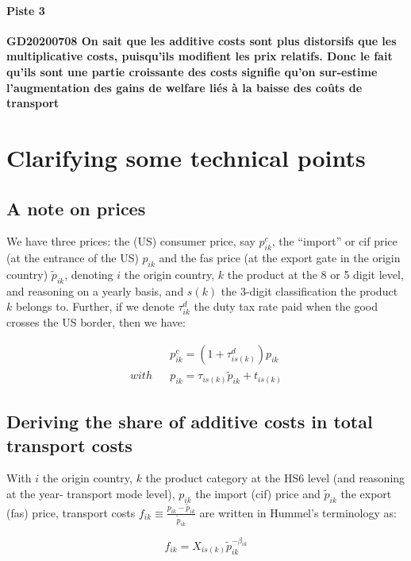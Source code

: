 \documentclass[a4paper,12pt]{article}
\begin{document}
\paragraph{Piste 3} \textbf{GD20200708 On sait que les additive costs sont plus distorsifs que les multiplicative costs, puisqu’ils modifient les prix relatifs. Donc le fait qu’ils sont une partie croissante des costs signifie qu’on sur-estime l’augmentation des gains de welfare liés à la baisse des coûts de transport}

\appendix


\section{Clarifying some technical points \label{ssec:technical_points}}


\subsection{A note on prices}

We have three prices: the (US) consumer price, say $p^{c}_{ik}$, the ``import'' or  cif price (at the entrance of the US) $p_{ik}$ and the fas price (at the export gate in the origin country) $\widetilde{p}_{ik}$, denoting $i$ the origin country, $k$ the product at the 8 or 5 digit level, and reasoning on a yearly basis, and $s(k)$ the 3-digit classification the product $k$ belongs to. Further, if we denote $\tau^d_{ik}$ the duty tax rate paid when the good crosses the US border, then we have:

\begin{eqnarray*}
&&p^c_{ik} = (1+\tau^d_{is(k)})p_{ik} \\
with && p_{ik}  = \tau_{is(k)} \widetilde{p}_{ik} +t_{is(k)}
\end{eqnarray*}


\subsection{Deriving the share of additive costs in total transport costs \label{ssec:interpret_beta}}


With $i$ the origin country, $k$ the product category at the HS6 level (and reasoning at the year- transport mode level), $p_{ik}$ the import (cif) price and $\tilde{p}_{ik}$ the export (fas) price, transport costs $f_{ik}\equiv \frac{p_{ik}- \tilde{p}_{ik}}{\tilde{p}_{ik}} $ are written in Hummel's terminology as:


\begin{equation}
f_{ik} = X_{is(k)}\tilde{p}_{ik}^{-\beta_{ik}} \label{eq:Hummels}
\end{equation}
\end{document}
